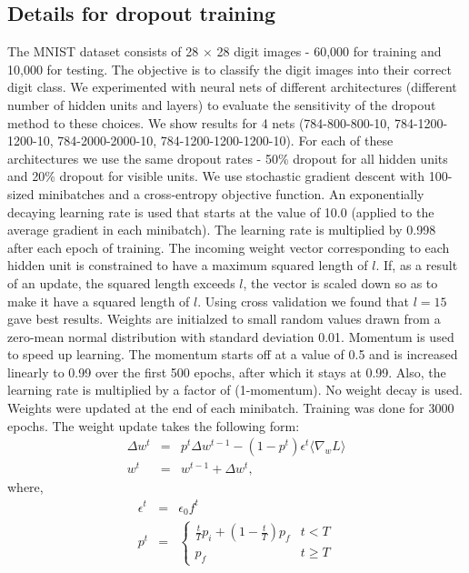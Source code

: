 \documentclass[12pt]{article}
\begin{document}
\subsection{Details for dropout training}
\label{sec:mnist_dropout_nopre}
The MNIST dataset consists of 28 $\times$ 28 digit images - 60,000 for training and 10,000 for testing.
The objective is to classify the digit images into their correct digit class.
We experimented with neural nets of different architectures (different number of hidden units and
layers) to evaluate the sensitivity of the dropout method to these choices. We show
results for 4 nets (784-800-800-10, 784-1200-1200-10, 784-2000-2000-10,
784-1200-1200-1200-10). For each of these architectures we use the same dropout
rates - 50\% dropout for all hidden units and 20\% dropout for visible units.
We use stochastic gradient descent with 100-sized minibatches and a cross-entropy objective function.
An exponentially decaying learning rate is used 
that starts at the value of 10.0 (applied to the average gradient in each
minibatch). The learning rate is multiplied by 0.998 after each epoch of
training. The incoming weight vector corresponding to each hidden unit is constrained to have a
maximum squared length of $l$. If, as a result of an update, the squared length
exceeds $l$, the vector is scaled down so as to make it have a squared length of
$l$. Using cross validation we found that $l = 15$ gave best results.
Weights are initialzed to small random values drawn from a zero-mean normal distribution with
standard deviation 0.01. Momentum is used to speed up learning. The momentum
starts off at a value of 0.5 and is increased linearly to 0.99 over the first
500 epochs, after which it stays at 0.99. Also, the learning rate is multiplied
by a factor of (1-momentum). No weight decay is used.
Weights were updated at the end of each minibatch.
Training was done for 3000 epochs. 
The weight update takes the following form:
\begin{eqnarray*}
\Delta w^{t} & = & p^{t}\Delta w^{t-1} - (1-p^{t})\epsilon^{t}\langle \nabla_w L \rangle \\
w^{t} & = & w^{t-1} + \Delta w^{t},
\end{eqnarray*}
where,
\begin{eqnarray*}
\epsilon^{t} & = & \epsilon_{0}f^{t}\\
p^{t} &=& \begin{cases} 
            \frac{t}{T}p_{i} + (1-\frac{t}{T})p_{f} & t < T \\
            p_{f} & t \geq T
        \end{cases}
\end{eqnarray*}
\end{document}
